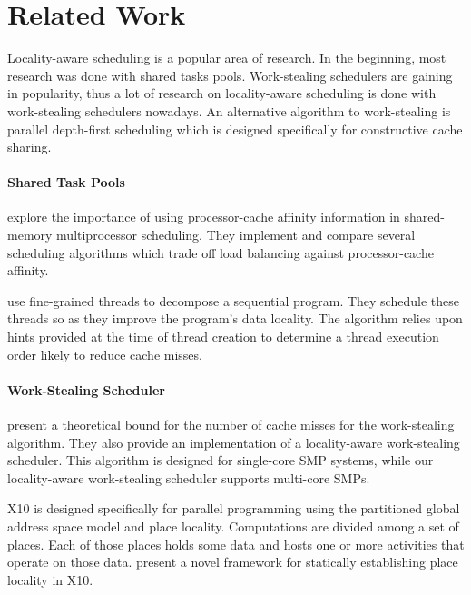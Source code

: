 
\chapter{Related Work}
\label{chap:locality-related-work}

Locality-aware scheduling is a popular area of research. In the
beginning, most research was done with shared tasks
pools. Work-stealing schedulers are gaining in popularity, thus a lot
of research on locality-aware scheduling is done with work-stealing
schedulers nowadays. An alternative algorithm to work-stealing is
parallel depth-first scheduling which is designed specifically for
constructive cache sharing.

\subsubsection{Shared Task Pools}

\textcite{Squillante1993} explore the importance of using
processor-cache affinity information in shared-memory multiprocessor
scheduling. They implement and compare several scheduling algorithms
which trade off load balancing against processor-cache affinity.

\textcite{Philbin1996} use fine-grained threads to decompose a
sequential program. They schedule these threads so as they improve the
program's data locality. The algorithm relies upon hints provided at
the time of thread creation to determine a thread execution order
likely to reduce cache misses.

\subsubsection{Work-Stealing Scheduler}

\textcite{Acar2000} present a theoretical bound for the number of
cache misses for the work-stealing algorithm. They also provide an
implementation of a locality-aware work-stealing scheduler. This
algorithm is designed for single-core SMP systems, while our
locality-aware work-stealing scheduler supports multi-core SMPs.

X10 \cite{Charles2005, Saraswat2010} is designed specifically for
parallel programming using the partitioned global address space model
and place locality. Computations are divided among a set of
places. Each of those places holds some data and hosts one or more
activities that operate on those data. \textcite{Agarwal2008} present
a novel framework for statically establishing place locality in X10.

